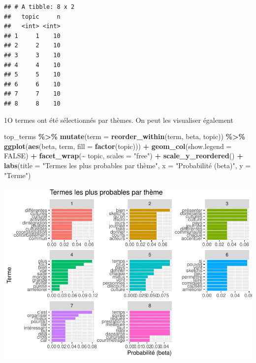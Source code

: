 \documentclass[
]{article}
\newenvironment{Shaded}{\begin{snugshade}}{\end{snugshade}}
\newcommand{\AttributeTok}[1]{\textcolor[rgb]{0.13,0.29,0.53}{#1}}
\newcommand{\ConstantTok}[1]{\textcolor[rgb]{0.56,0.35,0.01}{#1}}
\newcommand{\FunctionTok}[1]{\textcolor[rgb]{0.13,0.29,0.53}{\textbf{#1}}}
\newcommand{\NormalTok}[1]{#1}
\newcommand{\SpecialCharTok}[1]{\textcolor[rgb]{0.81,0.36,0.00}{\textbf{#1}}}
\newcommand{\StringTok}[1]{\textcolor[rgb]{0.31,0.60,0.02}{#1}}
\begin{document}
\begin{verbatim}
## # A tibble: 8 x 2
##   topic     n
##   <int> <int>
## 1     1    10
## 2     2    10
## 3     3    10
## 4     4    10
## 5     5    10
## 6     6    10
## 7     7    10
## 8     8    10
\end{verbatim}

1O termes ont été sélectionnés par thèmes. On peut les visualiser
également

\begin{Shaded}
\begin{Highlighting}[]
\NormalTok{top\_terms }\SpecialCharTok{\%\textgreater{}\%}
  \FunctionTok{mutate}\NormalTok{(}\AttributeTok{term =} \FunctionTok{reorder\_within}\NormalTok{(term, beta, topic)) }\SpecialCharTok{\%\textgreater{}\%}
  \FunctionTok{ggplot}\NormalTok{(}\FunctionTok{aes}\NormalTok{(beta, term, }\AttributeTok{fill =} \FunctionTok{factor}\NormalTok{(topic))) }\SpecialCharTok{+}
  \FunctionTok{geom\_col}\NormalTok{(}\AttributeTok{show.legend =} \ConstantTok{FALSE}\NormalTok{) }\SpecialCharTok{+}
  \FunctionTok{facet\_wrap}\NormalTok{(}\SpecialCharTok{\textasciitilde{}}\NormalTok{ topic, }\AttributeTok{scales =} \StringTok{"free"}\NormalTok{) }\SpecialCharTok{+}
  \FunctionTok{scale\_y\_reordered}\NormalTok{() }\SpecialCharTok{+}
  \FunctionTok{labs}\NormalTok{(}\AttributeTok{title =} \StringTok{"Termes les plus probables par thème"}\NormalTok{,}
       \AttributeTok{x =} \StringTok{"Probabilité (beta)"}\NormalTok{, }\AttributeTok{y =} \StringTok{"Terme"}\NormalTok{)}
\end{Highlighting}
\end{Shaded}

\includegraphics{Texte_mining_files/figure-latex/unnamed-chunk-34-1.pdf}
\end{document}
